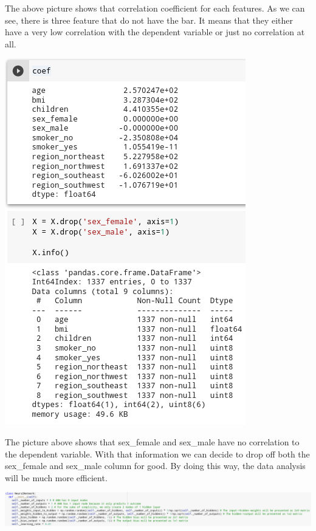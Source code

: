 \documentclass[a4paper, 12pt]{article}
\begin{document}
\begin{multicols}{2}
\justifying
The above picture shows that correlation coefficient for each features. As we can see, there is three feature that do not have the bar. It means that they either have a very low correlation with the dependent variable or just no correlation at all.

\centering
\vspace{0.2cm}
\includegraphics[scale=0.45]{feature_selection_3}
\vspace{0.2cm}

\justifying
The picture above shows that sex\_female and sex\_male have no correlation to the dependent variable. With that information we can decide to drop off both the sex\_female and sex\_male column for good. By doing this way, the data analysis will be much more efficient.

\centering
\vspace{0.2cm}
\includegraphics[scale=0.125]{nn_1}
\vspace{0.2cm}


\end{multicols}
\end{document}
